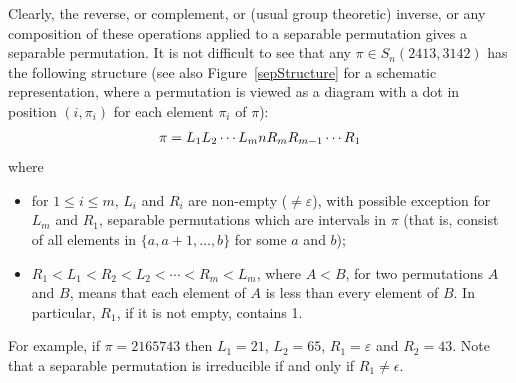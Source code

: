 \documentclass[10pt,a4paper]{article}
\begin{document}
Clearly, the reverse, or complement, or (usual group theoretic) inverse, or any composition of these operations applied to a separable permutation gives a separable permutation. It is not difficult to see that any $\pi\in S_n(2413,3142)$ has the following structure (see also Figure~\ref{sepStructure} for a schematic representation, where a permutation is viewed as a diagram with a dot in position $(i,\pi_i)$ for each element $\pi_i$ of $\pi$):
\begin{align}
	\pi=L_1L_2\cdots
	L_mnR_mR_{m-1}\cdots R_1\notag
\end{align}
where
\begin{itemize}
	\item[(1)] for $1\leq i\leq m$, $L_i$ and $R_i$ are non-empty ($\neq \varepsilon$), with possible exception for
	$L_m$ and $R_1$, separable permutations which are intervals in $\pi$ (that is, consist of all elements in $\{a,a+1,\ldots,b\}$ for some $a$ and $b$);
	\item[(2)]  $R_1<L_1<R_2<L_2<\cdots <R_m<L_m$, where $A<B$, for two
	permutations $A$ and $B$, means that each element of $A$ is less than
	every element of $B$. In particular, $R_1$, if it is not empty,
	contains 1.
\end{itemize}

\noindent
For example, if $\pi=2165743$ then $L_1=21$, $L_2=65$, $R_1=\varepsilon$ and $R_2=43$. Note that a separable permutation is irreducible if and only if $R_1\neq \epsilon$.
\end{document}
